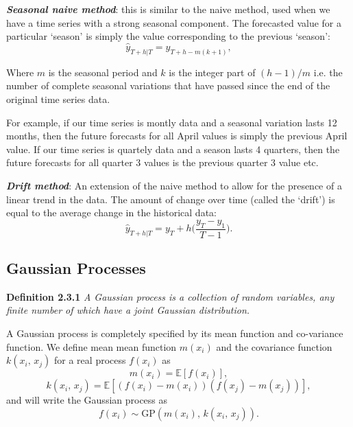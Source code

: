       \textbf{\textit{Seasonal naive method}}: this is similar to the naive method, used when we have a time series with a strong seasonal component. The forecasted value for a particular `season' is simply the value corresponding to the previous `season': \[\hat{y}_{T+h|T} = y_{T+h-m(k+1)},\]

      Where \(m\) is the seasonal period and \(k\) is the integer part of \((h-1)/m\) i.e. the number of complete seasonal variations that have passed since the end of the original time series data.

      \vspace{1em}

      For example, if our time series is montly data and a seasonal variation lasts 12 months, then the future forecasts for all April values is simply the previous April value. If our time series is quartely data and a season lasts 4 quarters, then the future forecasts for all quarter 3 values is the previous quarter 3 value etc.

      \vspace{1em}

      \textbf{\textit{Drift method}}: An extension of the naive method to allow for the presence of a linear trend in the data. The amount of change over time (called the `drift') is equal to the average change in the historical data: \[\hat{y}_{T+h|T} = y_{T} + h \Big(\frac{y_{T} - y_{1}}{T-1} \Big).\]

   \subsection{Gaussian Processes}

      \textbf{Definition 2.3.1} \cite{Rasmussen2006} \textit{A Gaussian process is a collection of random variables, any finite number of which have a joint Gaussian distribution.}

      \vspace{1em}

      A Gaussian process is completely specified by its mean function and co-variance function. We define mean mean function \(m(x_{i})\) and the covariance function \(k(x_{i},\, x_{j})\) for a real process \(f(x_{i})\) as
      \[m(x_{i}) = \mathbb{E}[f(x_{i})],\]
      \[k(x_{i},\, x_{j}) = \mathbb{E}[(f(x_{i}) - m(x_{i}))(f(x_{j}) - m(x_{j}))],\]
      and will write the Gaussian process as
      \[f(x_{i}) \sim \text{GP}(m(x_{i}), \, k(x_{i},\, x_{j})).\]

